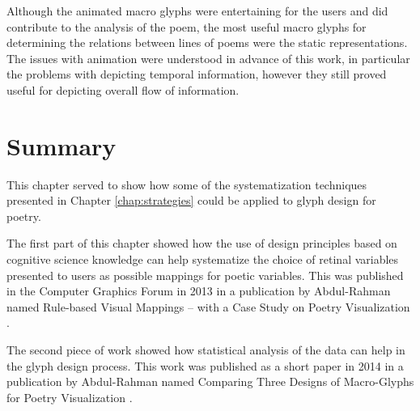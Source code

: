 Although the animated macro glyphs were entertaining for the users and did contribute to the analysis of the poem, the most useful macro glyphs for determining the relations between lines of poems were the static representations. 
The issues with animation were understood in advance of this work, in particular the problems with depicting temporal information, however they still proved useful for depicting overall flow of information. 

\section{Summary}

This chapter served to show how some of the systematization techniques presented in Chapter \ref{chap:strategies} could be applied to glyph design for poetry.

The first part of this chapter showed how the use of design principles based on cognitive science knowledge can help systematize the choice of retinal variables presented to users as possible mappings for poetic variables. 
This was published in the Computer Graphics Forum in 2013 in a publication by Abdul-Rahman \etal named Rule-based Visual Mappings -- with a Case Study on Poetry Visualization \cite{CGF:Abd2013a}. 

The second piece of work showed how statistical analysis of the data can help in the glyph design process. 
This work was published as a short paper in 2014 in a publication by Abdul-Rahman \etal named Comparing Three Designs of Macro-Glyphs for Poetry Visualization \cite{CGF:abdul-rahman14-sp}. 
